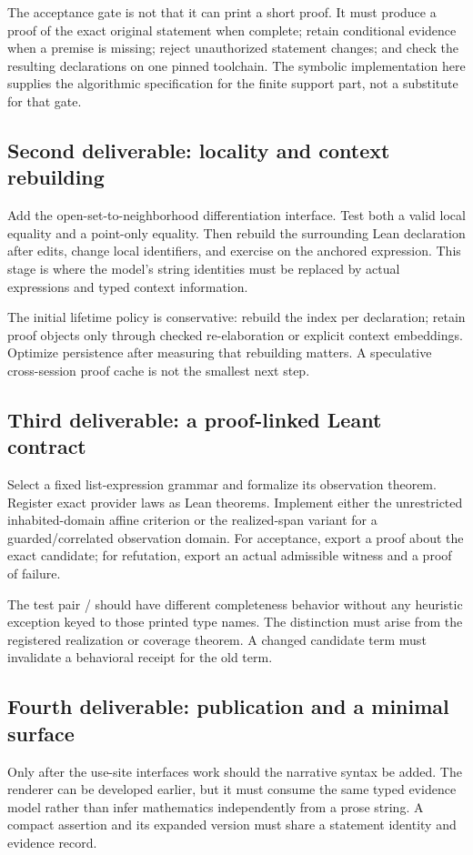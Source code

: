 \documentclass[11pt,a4paper]{article}
\newcommand{\code}[1]{\texttt{\detokenize{#1}}}
\theoremstyle{definition}
\theoremstyle{remark}
\begin{document}
The acceptance gate is not that it can print a short proof. It must produce a proof of the exact original statement when complete; retain conditional evidence when a premise is missing; reject unauthorized statement changes; and check the resulting declarations on one pinned toolchain. The symbolic implementation here supplies the algorithmic specification for the finite support part, not a substitute for that gate.

\subsection{Second deliverable: locality and context rebuilding}
Add the open-set-to-neighborhood differentiation interface. Test both a valid local equality and a point-only equality. Then rebuild the surrounding Lean declaration after edits, change local identifiers, and exercise \code{simp} on the anchored expression. This stage is where the model's string identities must be replaced by actual expressions and typed context information.

The initial lifetime policy is conservative: rebuild the index per declaration; retain proof objects only through checked re-elaboration or explicit context embeddings. Optimize persistence after measuring that rebuilding matters. A speculative cross-session proof cache is not the smallest next step.

\subsection{Third deliverable: a proof-linked Leant contract}
Select a fixed list-expression grammar and formalize its observation theorem. Register exact provider laws as Lean theorems. Implement either the unrestricted inhabited-domain affine criterion or the realized-span variant for a guarded/correlated observation domain. For acceptance, export a proof about the exact candidate; for refutation, export an actual admissible witness and a proof of failure.

The test pair \code{List Nat}/\code{List Empty} should have different completeness behavior without any heuristic exception keyed to those printed type names. The distinction must arise from the registered realization or coverage theorem. A changed candidate term must invalidate a behavioral receipt for the old term.

\subsection{Fourth deliverable: publication and a minimal surface}
Only after the use-site interfaces work should the narrative syntax be added. The renderer can be developed earlier, but it must consume the same typed evidence model rather than infer mathematics independently from a prose string. A compact assertion and its expanded version must share a statement identity and evidence record.
\end{document}

